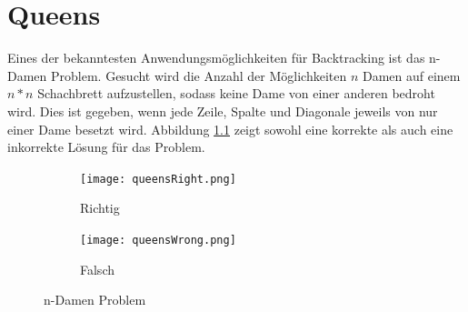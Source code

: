 \chapter{Queens}
Eines der bekanntesten Anwendungsmöglichkeiten für Backtracking ist das n-Damen Problem.
Gesucht wird die Anzahl der Möglichkeiten $n$ Damen auf einem $n * n$ Schachbrett aufzustellen, sodass
keine Dame von einer anderen bedroht wird. Dies ist gegeben, wenn jede Zeile, Spalte und Diagonale jeweils von nur einer Dame
besetzt wird. Abbildung \ref{fig:n4} zeigt sowohl eine korrekte als auch eine inkorrekte Lösung für das Problem.
\begin{figure}
  \centering
  \begin{subfigure}{0.4\linewidth}
    \texttt{[image: queensRight.png]}
    \caption{Richtig}
  \end{subfigure}
  \begin{subfigure}{0.4\linewidth}
    \texttt{[image: queensWrong.png]}
    \caption{Falsch}
  \end{subfigure}
  \caption{n-Damen Problem}
  \label{fig:n4}
\end{figure}

